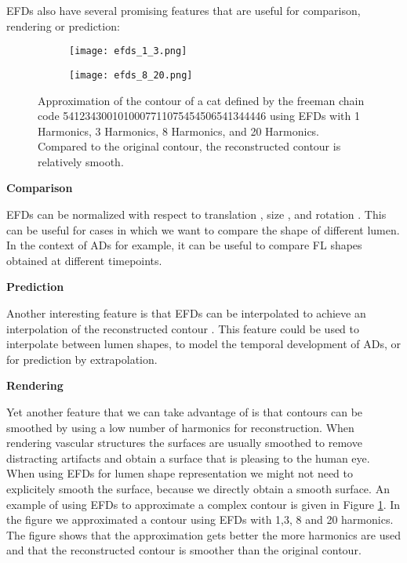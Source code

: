 \documentclass[thesis.tex]{subfiles}
\begin{document}
EFDs also have several promising features that are useful for comparison, rendering or prediction:

\begin{figure}
	\begin{subfigure}{\textwidth}
		\texttt{[image: efds\_1\_3.png]}		
	\end{subfigure}
	\begin{subfigure}{\textwidth}
		\texttt{[image: efds\_8\_20.png]}		
	\end{subfigure}
	\caption{Approximation of the contour of a cat defined by the freeman chain code 5412343001010007711075454506541344446 using EFDs with 1 Harmonics, 3 Harmonics, 8 Harmonics, and 20 Harmonics. Compared to the original contour, the reconstructed contour is relatively smooth.}
\label{fig:efd_approx}
\end{figure}
\textbf{Comparison}

EFDs can be normalized with respect to translation \cite{giardinia}, size \cite{giardinia}, and rotation \cite{lin1987new, giardinia}. This can be useful for cases in which we want to compare the shape of different lumen. In the context of ADs for example, it can be useful to compare FL shapes obtained at different timepoints. 

\textbf{Prediction}

Another interesting feature is that EFDs can be interpolated to achieve an interpolation of the reconstructed contour \cite{jeong2007reslicing}. This feature could be used to interpolate between lumen shapes, to model the temporal development of ADs, or for prediction by extrapolation. 

\textbf{Rendering}

Yet another feature that we can take advantage of is that contours can be smoothed by using a low number of harmonics for reconstruction. When rendering vascular structures the surfaces are usually smoothed to remove distracting artifacts and obtain a surface that is pleasing to the human eye. When using EFDs for lumen shape representation we might not need to explicitely smooth the surface, because we directly obtain a smooth surface. 
An example of using EFDs to approximate a complex contour is given in Figure \ref{fig:efd_approx}. In the figure we approximated a contour using EFDs with 1,3, 8 and 20 harmonics. The figure shows that the approximation gets better the more harmonics are used and that the reconstructed contour is smoother than the original contour.





\subfilebib %
\end{document}
